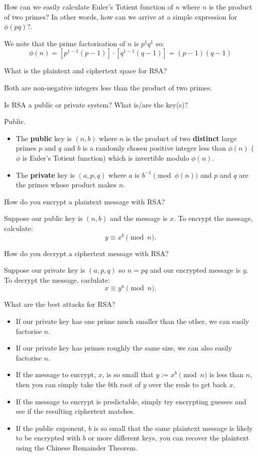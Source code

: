 \documentclass{article}
\newcounter{qcounter}
\newcommand{\showqcounter}{\theqcounter}
\newcommand{\question}{\vspace{5mm}\addtocounter{qcounter}{1}\vspace{5mm}{\bf Q\showqcounter: }}
\newcommand{\answer}{\vspace{5mm}{\bf A\showqcounter: }}
\begin{document}
\question How can we easily calculate Euler's Totient function of $n$ where $n$ is the product of two primes? In other words, 
how can we arrive at a simple expression for $\phi(p q)$?.

\answer We note that the prime factorisation of $n$ is $p^1 q^1$ so:
$$
  \phi(n) = \left[p^{1 - 1} (p - 1)\right] \cdot \left[q^{1 - 1} (q - 1)\right] = (p - 1) (q - 1)
$$


\question What is the plaintext and ciphertext space for RSA?

\answer Both are non-negative integers less than the product of two primes.


\question Is RSA a public or private system? What is/are the key(s)?

\answer Public. 
  \begin{itemize}
    \item The {\bf public} key is $(n, b)$ where $n$ is the product of two {\bf distinct} large primes $p$ and $q$ and 
      $b$ is a randomly chosen positive integer less than $\phi(n)$ ($\phi$ is Euler's Totient function) which is 
      invertible modulo $\phi(n)$.
    \item The {\bf private} key is $(a, p, q)$ where $a$ is $b^{-1} \pmod{\phi(n)}$ and $p$ and $q$ are 
      the primes whose product makes $n$.
  \end{itemize}


\question How do you encrypt a plaintext message with RSA?

\answer Suppose our public key is $(n, b)$ and the message is $x$. To encrypt the message, calculate:
  $$
    y \equiv x^b \pmod{n}.
  $$


\question How do you decrypt a ciphertext message with RSA?

\answer Suppose our private key is $(a, p, q)$ so $n = p q$ and our encrypted message is $y$. To decrypt the message, caclulate:
  $$
    x \equiv y^a \pmod{n}.
  $$


\question What are the best attacks for RSA?

\answer 
  \begin{itemize}
    \item If our private key has one prime much smaller than the other, we can easily factorise $n$.
    \item If our private key has primes roughly the same size, we can also easily factorise $n$.
    \item If the message to encrypt, $x$, is so small that $y := x^b \pmod{n}$ is less than $n$, then you can simply take the $b$th root 
      of $y$ over the reals to get back $x$.
    \item If the message to encrypt is predictable, simply try encrypting guesses and see if the resulting ciphertext matches.
    \item If the public exponent, $b$ is so small that the same plaintext message is likely to be encrypted with $b$ or more different keys, 
      you can recover the plaintext using the Chinese Remainder Theorem.
  \end{itemize}
\end{document}
